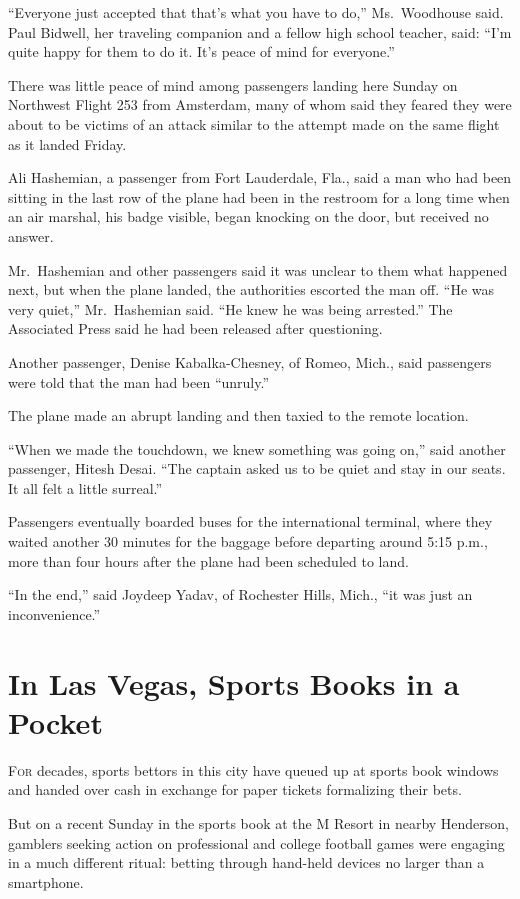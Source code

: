 ﻿\documentclass[12pt]{article}
\begin{document}
``Everyone just accepted that that's what you have to do,'' Ms.~Woodhouse said. Paul Bidwell, her
traveling companion and a fellow high school teacher, said: ``I'm quite happy for them to do it.
It's peace of mind for everyone.''

There was little peace of mind among passengers landing here Sunday on Northwest Flight 253 from
Amsterdam, many of whom said they feared they were about to be victims of an attack similar to the
attempt made on the same flight as it landed Friday.

Ali Hashemian, a passenger from Fort Lauderdale, Fla., said a man who had been sitting in the last
row of the plane had been in the restroom for a long time when an air marshal, his badge visible,
began knocking on the door, but received no answer.

Mr.~Hashemian and other passengers said it was unclear to them what happened next, but when the
plane landed, the authorities escorted the man off. ``He was very quiet,'' Mr.~Hashemian said. ``He
knew he was being arrested.'' The Associated Press said he had been released after questioning.

Another passenger, Denise Kabalka-Chesney, of Romeo, Mich., said passengers were told that the man
had been ``unruly.''

The plane made an abrupt landing and then taxied to the remote location.

``When we made the touchdown, we knew something was going on,'' said another passenger, Hitesh
Desai. ``The captain asked us to be quiet and stay in our seats. It all felt a little surreal.''

Passengers eventually boarded buses for the international terminal, where they waited another 30
minutes for the baggage before departing around 5:15 p.m., more than four hours after the plane had
been scheduled to land.

``In the end,'' said Joydeep Yadav, of Rochester Hills, Mich., ``it was just an inconvenience.''

\section{In Las Vegas, Sports Books in a Pocket}

\lettrine{F}{or} decades, sports bettors in this city have queued up at
sports book windows and handed over cash in exchange for paper tickets formalizing their bets.

But on a recent Sunday in the sports book at the M Resort in nearby Henderson, gamblers seeking
action on professional and college football games were engaging in a much different ritual: betting
through hand-held devices no larger than a smartphone.
\end{document}
